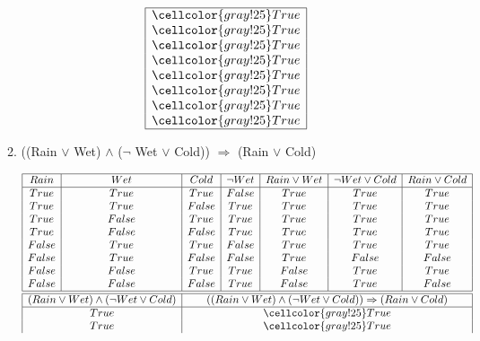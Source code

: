 \documentclass[10pt]{article}
\begin{document}
\begin{enumerate}
\begin{enumerate}
\begin{displaymath}
\begin{array} {|c|c|c|c|c|c|c|}
      \hline
      \multicolumn{7}{|c|}{\cellcolor{gray!25}True} \\
      \multicolumn{7}{|c|}{\cellcolor{gray!25}True} \\
      \multicolumn{7}{|c|}{\cellcolor{gray!25}True} \\
      \multicolumn{7}{|c|}{\cellcolor{gray!25}True} \\
      \multicolumn{7}{|c|}{\cellcolor{gray!25}True} \\
      \multicolumn{7}{|c|}{\cellcolor{gray!25}True} \\
      \multicolumn{7}{|c|}{\cellcolor{gray!25}True} \\
      \multicolumn{7}{|c|}{\cellcolor{gray!25}True} \\
      \hline
    \end{array}
  \end{displaymath}
  \item ((Rain $\vee$ Wet) $\wedge$ ($\neg$ Wet $\vee$ Cold)) $\Rightarrow$ (Rain $\vee$ Cold) \par
  \begin{displaymath}
    \begin{array} {|c|c|c|c|c|c|c|}
  	  \hline
      Rain & Wet & Cold & \neg Wet & Rain \vee Wet & \neg Wet \vee Cold & Rain \vee Cold \\
      \hline
      True & True & True & False & True & True & True \\
      True & True & False & True & True & True & True \\
      True & False & True & True & True & True & True \\
      True & False & False & True & True & True & True \\
      False & True & True & False & True & True & True \\
      False & True & False & False & True & False & False \\
      False & False & True & True & False & True & True \\
      False & False & False & True & False & True & False \\
      \hline\hline
      \multicolumn{2}{|c|}{(Rain \vee Wet) \wedge (\neg Wet \vee Cold)} & \multicolumn{5}{c|}{((Rain \vee Wet) \wedge (\neg Wet \vee Cold)) \Rightarrow (Rain \vee Cold)} \\
      \hline
      \multicolumn{2}{|c|}{True} & \multicolumn{5}{c|}{\cellcolor{gray!25}True}\\
      \multicolumn{2}{|c|}{True} & \multicolumn{5}{c|}{\cellcolor{gray!25}True}\\

\end{array}
\end{displaymath}
\end{enumerate}
\end{enumerate}
\end{document}
